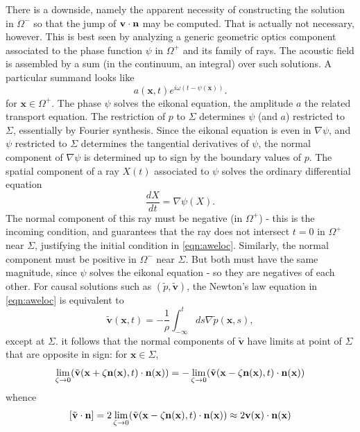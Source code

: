 \documentclass[12pt]{geophysics}
\newcommand{\bx}{\mathbf{x}}
\newcommand{\bv}{\mathbf{v}}
\begin{document}
There is a downside, namely the apparent necessity of constructing the
solution in $\Omega^-$ so that the jump of $\bv \cdot {\bf n}$ may be
computed. That is actually not necessary, however.
This is best seen by analyzing a generic geometric optics
component associated to the phase function $\psi$ in $\Omega^+$ and its family of
rays. The acoustic field is assembled by a sum (in the continuum, an
integral) over such solutions. A particular summand looks like
\begin{equation}
  \label{eqn:go}
   a(\bx,t)e^{i\omega (t - \psi(\bx))}.
\end{equation}
for $\bx \in \Omega^+$.
The phase $\psi$ solves the eikonal equation, the amplitude $a$ the
related transport equation. The restriction of $p$
to $\Sigma$ determines $\psi$ (and $a$) restricted to $\Sigma$, essentially by
Fourier synthesis. Since the eikonal
equation is even in $\nabla \psi$,  and $\psi$ restricted to $\Sigma$
determines the tangential derivatives of $\psi$, the normal component
of $\nabla \psi$ is determined up to sign by the boundary values of
$p$. The spatial component of a ray $X(t)$ associated to $\psi$ solves
the ordinary differential equation
\begin{equation}
  \label{eqn:ray}
  \frac{dX}{dt} = \nabla \psi(X).
\end{equation}
The normal component of this ray must be negative (in
$\Omega^+$) - this is the incoming condition, and guarantees that the
ray does not intersect $t=0$ in $\Omega^+$ near $\Sigma$, justifying the initial
condition in \ref{eqn:aweloc}. Similarly, the normal component must be
positive in $\Omega^-$ near $\Sigma$. But both must have the same magnitude, since
$\psi$ solves the eikonal equation - so they are negatives of each
other. For causal solutions such as $(\tilde{p},\tilde{\bv})$, the
Newton's law equation in \ref{eqn:aweloc} is equivalent to
\begin{equation}\label{eqn:newt}
  \tilde{\bv}(\bx,t) = -\frac{1}{\rho}\int_{-\infty}^t ds \nabla \tilde{p}(\bx,s),
\end{equation}
except at $\Sigma$.
it follows that the normal components of $\tilde{\bv}$ have limits at
point of $\Sigma$ 
that are opposite in sign: for $\bx \in \Sigma$,
\[
  \lim_{\zeta \rightarrow 0} (\tilde{\bv}(\bx+\zeta {\bf n}(\bx),t) \cdot {\bf
    n}(\bx)) = 
-\lim_{\zeta \rightarrow 0} (\tilde{\bv}(\bx-\zeta {\bf n}(\bx),t) \cdot {\bf
  n}(\bx))
\]
whence
\begin{equation}
   \label{eqn:vjump}
   [\tilde{\bv} \cdot {\bf n}] = 2 \lim_{\zeta
  \rightarrow 0} (\tilde{\bv}(\bx -\zeta {\bf
  n}(\bx),t) \cdot {\bf n}(\bx))
\approx 2 \bv(\bx) \cdot {\bf n}(\bx)
\end{equation}
\end{document}
